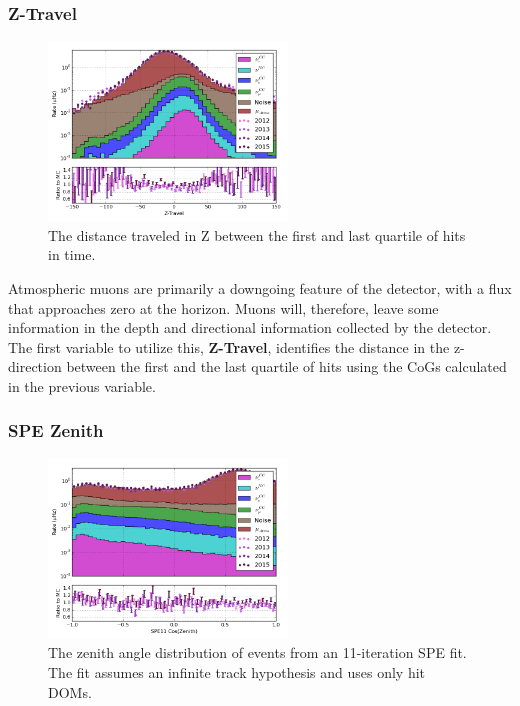 \subsubsection{Z-Travel}
\begin{figure}[h]
	\centering
		\includegraphics[width=2.5in]{Z-Travel_log.png}
		\caption[Quartile Z-Travel]{The distance traveled in Z between the first and last quartile of hits in time.}
	\label{fig:quartile_ztravel}
\end{figure}

Atmospheric muons are primarily a downgoing feature of the detector, with a flux that approaches zero at the horizon.
Muons will, therefore, leave some information in the depth and directional information collected by the detector.
The first variable to utilize this, \textbf{Z-Travel}, identifies the distance in the z-direction between the first and the last quartile of hits using the CoGs calculated in the previous variable.

\subsubsection{SPE Zenith}
\begin{figure}[h]
	\centering
		\includegraphics[width=2.5in]{SPE11_Cos(Zenith)_log.png}
		\caption[SPE Reconstruction Zenith Angles]{The zenith angle distribution of events from an 11-iteration SPE fit. The fit assumes an infinite track hypothesis and uses only hit DOMs.}
	\label{fig:spe11_zenith}
\end{figure}

